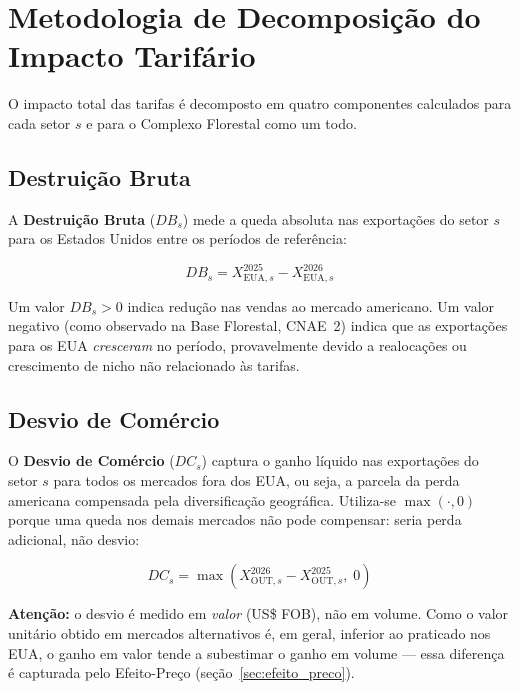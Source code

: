 \documentclass[12pt, a4paper]{article}
\begin{document}
\section{Metodologia de Decomposição do Impacto Tarifário}

O impacto total das tarifas é decomposto em quatro componentes calculados
para cada setor \(s\) e para o Complexo Florestal como um todo.

\subsection{Destruição Bruta}

A \textbf{Destruição Bruta} (\(DB_s\)) mede a queda absoluta nas exportações
do setor \(s\) para os Estados Unidos entre os períodos de referência:

\begin{equation}
  \boxed{
    DB_s = X_{\text{EUA},s}^{2025} - X_{\text{EUA},s}^{2026}
  }
  \label{eq:db}
\end{equation}

Um valor $DB_s > 0$ indica redução nas vendas ao mercado americano.
Um valor negativo (como observado na Base Florestal, CNAE~2) indica que
as exportações para os EUA \emph{cresceram} no período, provavelmente
devido a realocações ou crescimento de nicho não relacionado às tarifas.

\subsection{Desvio de Comércio}

O \textbf{Desvio de Comércio} (\(DC_s\)) captura o ganho líquido nas
exportações do setor \(s\) para todos os mercados fora dos EUA,
ou seja, a parcela da perda americana compensada pela diversificação
geográfica. Utiliza-se $\max(\cdot, 0)$ porque uma queda nos demais
mercados não pode compensar: seria perda adicional, não desvio:

\begin{equation}
  \boxed{
    DC_s = \max\!\left(X_{\text{OUT},s}^{2026} - X_{\text{OUT},s}^{2025},\; 0\right)
  }
  \label{eq:dc}
\end{equation}

\noindent\textbf{Atenção:} o desvio é medido em \emph{valor} (US\$ FOB),
não em volume. Como o valor unitário obtido em mercados alternativos é,
em geral, inferior ao praticado nos EUA, o ganho em valor tende a
subestimar o ganho em volume — essa diferença é capturada pelo
Efeito-Preço (seção~\ref{sec:efeito_preco}).
\end{document}
